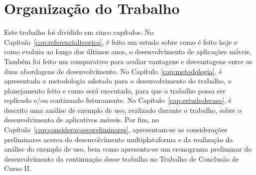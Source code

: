 \section{Organização do Trabalho}\label{sec:organizacao}

Este trabalho foi dividido em cinco capítulos. %
No Capítulo~\ref{cap:referencialteorico}, é feito um estudo sobre como é feito hoje e como evoluiu ao longo dos últimos anos, o desenvolvimento de aplicações 
móveis, Também foi feito um comparativo para avaliar vantagens e desvantagens entre as duas abordagens de desenvolvimento. 
No Capítulo~\ref{cap:metodologia}, é apresentada a metodologia adotada para o desenvolvimento do trabalho, o planejamento feito e como será executado, para que 
o trabalho possa ser replicado e/ou continuado futuramente.  
No Capítulo~\ref{cap:estudodecaso}, é descrito uma análise de exemplo de uso, realizado durante o trabalho, sobre o desenvolvimento de aplicativos móveis.
Por fim, no Capítulo~\ref{cap:consideracoespreliminares}, apresentam-se as considerações preliminares acerca do desenvolvimento multiplataforma e da realização da análise do exemplo de uso, bem como apresenta-se um 
cronograma preliminar do desenvolvimento da continuação desse trabalho no Trabalho de Conclusão de Curso II. 
